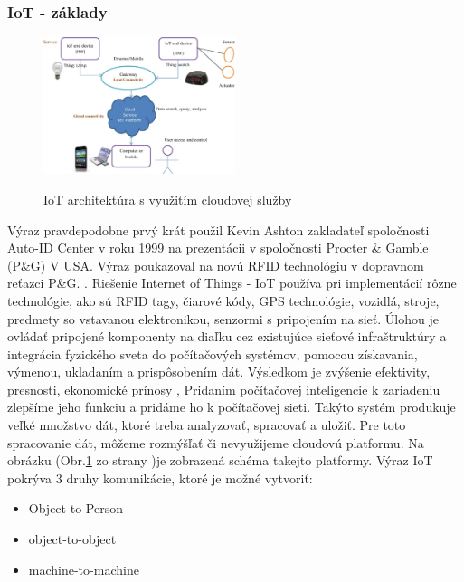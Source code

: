 \documentclass[./main.tex]{subfiles}
\begin{document}
    
\subsubsection{IoT - základy}

\begin{figure}
\centering
  \includegraphics[width=0.5\textwidth]{images/IoT_cloud_platform.png}
  \caption{IoT architektúra s využitím cloudovej
  služby}\cite{springerprofessional.de_The_Era_of_IoT}
  \label{fig:IoT_ARCH_CLOUD}
\end{figure} 

Výraz  pravdepodobne prvý krát použil  Kevin Ashton
zakladateľ spoločnosti Auto-ID Center v roku 1999 na prezentácii v spoločnosti Procter \& Gamble (P\&G) V USA. Výraz poukazoval na novú RFID technológiu v dopravnom reťazci P\&G. \cite{KODYS, kevinAshton}. Riešenie Internet of Things  -  IoT používa pri implementácií rôzne technológie, ako sú RFID tagy, čiarové kódy, GPS technológie, vozidlá, stroje, predmety so vstavanou elektronikou, senzormi s pripojením na sieť. Úlohou je ovládať pripojené komponenty na diaľku cez existujúce sieťové infraštruktúry a integrácia fyzického sveta\cite{KODYS} do počítačových systémov, pomocou získavania, výmenou, ukladaním a prispôsobením dát. Výsledkom je zvýšenie efektivity, presnosti, ekonomické prínosy \cite{industry4}, Pridaním počítačovej inteligencie k zariadeniu zlepšíme jeho funkciu a pridáme ho k počítačovej sieti. Takýto systém produkuje veľké množstvo dát, ktoré treba analyzovať, spracovať a uložiť. Pre toto spracovanie dát, môžeme rozmýšľať či nevyužijeme cloudovú platformu.\cite{springerprofessional.de_The_Era_of_IoT} %
Na obrázku (Obr.\ref{fig:IoT_ARCH_CLOUD} zo strany \pageref{fig:IoT_ARCH_CLOUD})je zobrazená schéma takejto platformy.
Výraz IoT pokrýva 3 druhy komunikácie, ktoré je možné vytvoriť:\cite{addressing_IoT_ipv6}
\begin{multicols}{3}
    \begin{itemize}
        \item Object-to-Person \item  object-to-object \item machine-to-machine
    \end{itemize}
\end{multicols}
\end{document}

